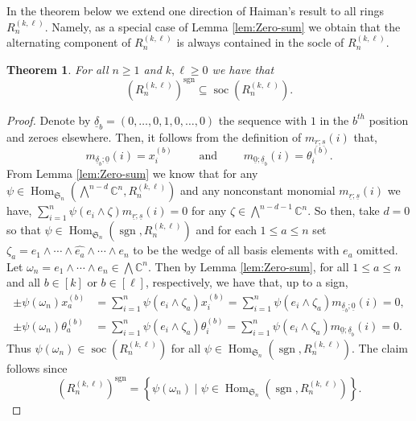 \documentclass[11pt, reqno]{amsart}
\newtheorem{theorem}{Theorem}[section]
\theoremstyle{definition}
\theoremstyle{remark}
\numberwithin{equation}{section}
\newcommand{\0}{\emptyset}
\newcommand{\C}{\mathbb{C}}
\renewcommand{\S}{\mathfrak{S}}
\renewcommand{\r}{\underline{r}}
\newcommand{\s}{\underline{s}}
\DeclareMathOperator{\sgn}{sgn}
\DeclareMathOperator{\Hom}{Hom}
\DeclareMathOperator{\soc}{soc}
\begin{document}
In the theorem below we extend one direction of Haiman's result to all rings $R_n^{(k,\ell)}$. 
Namely, as a special case of Lemma \ref{lem:Zero-sum} we obtain that 
the alternating component of $R_n^{(k,\ell)}$ is always contained in 
the socle of $R_n^{(k,\ell)}$.

\begin{theorem}\label{thm:socle} 
    For all $n\geq 1$ and $k,\ell \geq 0$ we have that
    \[
        \left(R_n^{(k,\ell)}\right)^{\sgn} \subseteq \soc\left(R_n^{(k,\ell)}\right).
    \]
\end{theorem}

\begin{proof}
Denote by $\underline{\delta}_b = (0,\ldots, 0, 1, 0, \ldots, 0)$ the sequence with $1$ in the $b^{th}$ position and zeroes elsewhere. Then, it follows from the definition of $m_{\r;\s}(i)$ that,
\[
m_{\underline{\delta}_b;\underline{0}}(i) = x_i^{(b)} 
\qquad \text{ and }\qquad
m_{\underline{0};\underline{\delta}_b}(i) = \theta_i^{(b)}.
\]
From Lemma \ref{lem:Zero-sum} we know that for any $\psi \in \Hom_{\S_n}\left(\bigwedge^{n-d}\C^n, R_n^{(k,\ell)}\right)$ and any nonconstant monomial $m_{\r;\s}(i)$ we have, 
$
    \sum_{i=1}^n \psi(e_i \wedge \zeta) m_{\r;\s}(i) = 0 
$
for any $\zeta \in \bigwedge^{n-d-1}\C^n$. So then, take $d=0$ so that $\psi \in \Hom_{\S_n}\left(\sgn, R_n^{(k,\ell)}\right)$ and for each $1\leq a \leq n$ set $\zeta_a = e_1\wedge \cdots \wedge \widehat{e_a} \wedge \cdots \wedge e_n$ to be the wedge of all basis elements with $e_a$ omitted. Let $\omega_n = e_1 \wedge \cdots \wedge e_n \in \bigwedge \C^n$. Then by Lemma \ref{lem:Zero-sum}, for all $1\leq a \leq n$  and all $b \in [k]$ or $b \in [\ell]$, respectively, we have that, up to a sign,
\begin{align*}
\pm\psi(\omega_n) x_a^{(b)}  &= \sum_{i=1}^n \psi(e_i \wedge \zeta_a) x_i^{(b)}= \sum_{i=1}^n \psi(e_i \wedge \zeta_a) m_{\underline{\delta}_b;\underline{0}}(i) = 0, \\
\pm\psi(\omega_n) \theta_a^{(b)}  &= \sum_{i=1}^n \psi(e_i \wedge \zeta_a) \theta_i^{(b)}= \sum_{i=1}^n \psi(e_i \wedge \zeta_a) m_{\underline{0};\underline{\delta}_b}(i) = 0.
\end{align*}
Thus $\psi(\omega_n) \in \soc(R_n^{(k,\ell)})$ for all $\psi \in \Hom_{\S_n}\left(\sgn, R_n^{(k,\ell)}\right)$. 
The claim follows since \[\left(R_n^{(k,\ell)}\right)^{\sgn} = \left\{ \psi(\omega_n) \mid \psi \in \Hom_{\S_n}\left(\sgn, R_n^{(k,\ell)}\right)\right\}.\] 
\end{proof}
\end{document}
